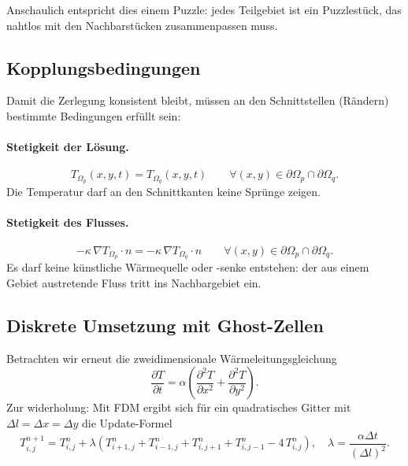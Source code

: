 Anschaulich entspricht dies einem Puzzle: 
jedes Teilgebiet ist ein Puzzlestück, das nahtlos mit den Nachbarstücken zusammenpassen muss.

\subsection{Kopplungsbedingungen}
Damit die Zerlegung konsistent bleibt, müssen an den Schnittstellen (Rändern) bestimmte Bedingungen erfüllt sein:

\paragraph{Stetigkeit der Lösung.}
\begin{equation}
	T_{\Omega_p}(x,y,t) = T_{\Omega_q}(x,y,t)
	\qquad \forall (x,y) \in \partial \Omega_p \cap \partial \Omega_q.
\end{equation}
Die Temperatur darf an den Schnittkanten keine Sprünge zeigen.

\paragraph{Stetigkeit des Flusses.}
\begin{equation}
	- \kappa \, \nabla T_{\Omega_p} \cdot n
	=
	- \kappa \, \nabla T_{\Omega_q} \cdot n
	\qquad \forall (x,y) \in \partial \Omega_p \cap \partial \Omega_q.
\end{equation}
Es darf keine künstliche Wärmequelle oder -senke entstehen: der aus einem Gebiet austretende Fluss tritt ins Nachbargebiet ein.

\subsection{Diskrete Umsetzung mit Ghost-Zellen}
Betrachten wir erneut die zweidimensionale Wärmeleitungsgleichung
\begin{equation}
	\frac{\partial T}{\partial t} = 
	\alpha \left(
	\frac{\partial^2 T}{\partial x^2} + \frac{\partial^2 T}{\partial y^2}
	\right).
\end{equation}
Zur widerholung: Mit FDM ergibt sich für ein quadratisches Gitter mit $\Delta l=\Delta x=\Delta y$ die Update-Formel
\begin{equation}
	T_{i,j}^{n+1}
	=
	T_{i,j}^{n}
	+
	\lambda \left(
	T_{i+1,j}^{n}+T_{i-1,j}^{n}+T_{i,j+1}^{n}+T_{i,j-1}^{n}-4\,T_{i,j}^{n}
	\right),
	\quad
	\lambda=\frac{\alpha\Delta t}{(\Delta l)^2}.
	\label{eq:update-dd}
\end{equation}

